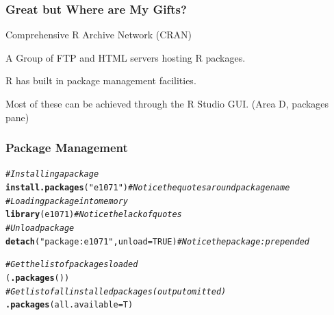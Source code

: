 \documentclass{beamer}\usepackage[]{graphicx}\usepackage[]{color}
\makeatletter
\newcommand{\hlnum}[1]{\textcolor[rgb]{0.686,0.059,0.569}{#1}}%
\newcommand{\hlstr}[1]{\textcolor[rgb]{0.192,0.494,0.8}{#1}}%
\newcommand{\hlcom}[1]{\textcolor[rgb]{0.678,0.584,0.686}{\textit{#1}}}%
\newcommand{\hlstd}[1]{\textcolor[rgb]{0.345,0.345,0.345}{#1}}%
\newcommand{\hlkwc}[1]{\textcolor[rgb]{0.333,0.667,0.333}{#1}}%
\newcommand{\hlkwd}[1]{\textcolor[rgb]{0.737,0.353,0.396}{\textbf{#1}}}%
\newenvironment{kframe}{%
 \def\at@end@of@kframe{}%
 \ifinner\ifhmode%
  \def\at@end@of@kframe{\end{minipage}}%
  \begin{minipage}{\columnwidth}%
 \fi\fi%
 \def\FrameCommand##1{\hskip\@totalleftmargin \hskip-\fboxsep
 \colorbox{shadecolor}{##1}\hskip-\fboxsep
     \hskip-\linewidth \hskip-\@totalleftmargin \hskip\columnwidth}%
 \MakeFramed {\advance\hsize-\width
   \@totalleftmargin\z@ \linewidth\hsize
   \@setminipage}}%
 {\par\unskip\endMakeFramed%
 \at@end@of@kframe}
\newenvironment{knitrout}{}{} %
\makeatother
\begin{document}
\begin{frame}
\frametitle{Great but Where are My Gifts?}
\vfill

{\Huge Comprehensive R Archive Network (CRAN)}

\vfill

A Group of FTP and HTML servers hosting R packages.

\vfill

R has built in package management facilities.

\vfill

Most of these can be achieved through the R Studio GUI. (Area D, packages pane)

\vfill

\end{frame}


\begin{frame}[fragile]
\frametitle{Package Management}

\begin{knitrout}\scriptsize
{}\color{fgcolor}\begin{kframe}
\begin{alltt}
\hlcom{# Installing a package}
\hlkwd{install.packages}\hlstd{(}\hlstr{"e1071"}\hlstd{)}  \hlcom{# Notice the quotes around package name}
\hlcom{# Loading package into memory}
\hlkwd{library}\hlstd{(e1071)}  \hlcom{# Notice the lack of quotes}
\hlcom{# Unload package}
\hlkwd{detach}\hlstd{(}\hlstr{"package:e1071"}\hlstd{,} \hlkwc{unload} \hlstd{=} \hlnum{TRUE}\hlstd{)}  \hlcom{# Notice the package: prepended}

\hlcom{# Get the list of packages loaded}
\hlstd{(}\hlkwd{.packages}\hlstd{())}
\hlcom{# Get list of all installed packages (output omitted)}
\hlkwd{.packages}\hlstd{(}\hlkwc{all.available} \hlstd{= T)}
\end{alltt}
\end{kframe}
\end{knitrout}
\end{frame}
\end{document}
